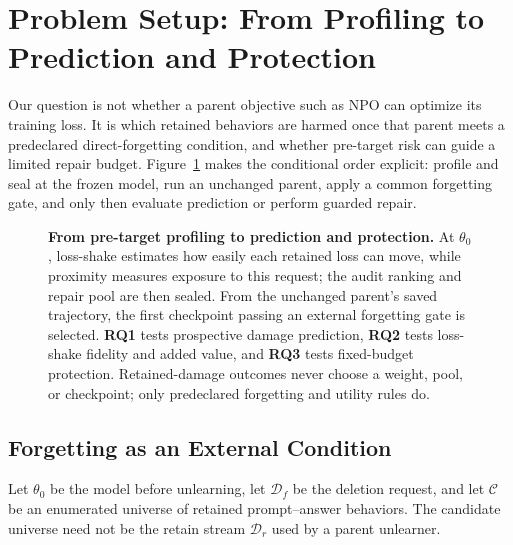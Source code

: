 \section{Problem Setup: From Profiling to Prediction and Protection}
\label{sec:setup}

Our question is not whether a parent objective such as NPO can optimize its
training loss. It is which retained behaviors are harmed once that parent
meets a predeclared direct-forgetting condition, and whether pre-target risk
can guide a limited repair budget. Figure~\ref{fig:method-overview} makes the conditional
order explicit: profile and seal at the frozen model, run an unchanged parent,
apply a common forgetting gate, and only then evaluate prediction or perform
guarded repair.

\begin{figure}[!t]
\centering

\caption{\textbf{From pre-target profiling to prediction and protection.}
At $\theta_0$, loss-shake estimates how easily each retained loss can move,
while proximity measures exposure to this request; the audit ranking and
repair pool are then sealed. From the unchanged parent's saved trajectory,
the first checkpoint passing an external forgetting gate is selected.
\textbf{RQ1} tests prospective damage
prediction, \textbf{RQ2} tests loss-shake fidelity and added value, and
\textbf{RQ3} tests fixed-budget protection. Retained-damage outcomes never
choose a weight, pool, or checkpoint; only predeclared forgetting and utility
rules do.}
\label{fig:method-overview}
\end{figure}

\subsection{Forgetting as an External Condition}
\label{sec:setup-prediction}

Let $\theta_0$ be the model before unlearning, let $\mathcal D_f$ be the
deletion request, and let $\mathcal C$ be an enumerated universe of retained
prompt--answer behaviors. The candidate universe need not be the retain stream
$\mathcal D_r$ used by a parent unlearner.

